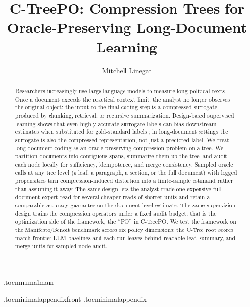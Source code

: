 \documentclass[11pt]{article}
\title{C-TreePO: Compression Trees for Oracle-Preserving Long-Document Learning}
\author{Mitchell Linegar}
\date{}
\begin{document}
\maketitle

\begin{abstract}
Researchers increasingly use large language models to measure long
political texts. Once a document exceeds the practical context
limit, the analyst no longer observes the original object: the
input to the final coding step is a compressed surrogate produced by
chunking, retrieval, or recursive summarization. Design-based
supervised learning shows that even highly accurate surrogate labels
can bias downstream estimates when substituted for gold-standard
labels \citep{EgamiEtAl2024}; in long-document settings the
surrogate is also the compressed representation, not just a
predicted label. We treat long-document coding as an
oracle-preserving compression problem on a tree. We partition
documents into contiguous spans, summarize them up the tree, and
audit each node locally for sufficiency, idempotence, and merge
consistency. Sampled oracle calls at any tree level (a leaf, a
paragraph, a section, or the full document) with logged propensities
turn compression-induced distortion into a finite-sample estimand
rather than assuming it away. The same design lets the analyst trade
one expensive full-document expert read for several cheaper reads of
shorter units and retain a comparable accuracy guarantee on the
document-level estimate. The same supervision design trains the
compression operators under a fixed audit budget; that is the
optimization side of the framework, the ``PO'' in C-TreePO. We test
the framework on the Manifesto/Benoit benchmark across six policy
dimensions: the C-Tree root scores match frontier LLM baselines and
each run leaves behind readable leaf, summary, and merge units for
sampled node audit.
\end{abstract}

\tableofcontents
\clearpage

\etocdepthtag.toc{minimalmain}










\appendix
\etocdepthtag.toc{minimalappendixfront}
\appendixcontents
\etocdepthtag.toc{minimalappendix}










\clearpage


\end{document}
